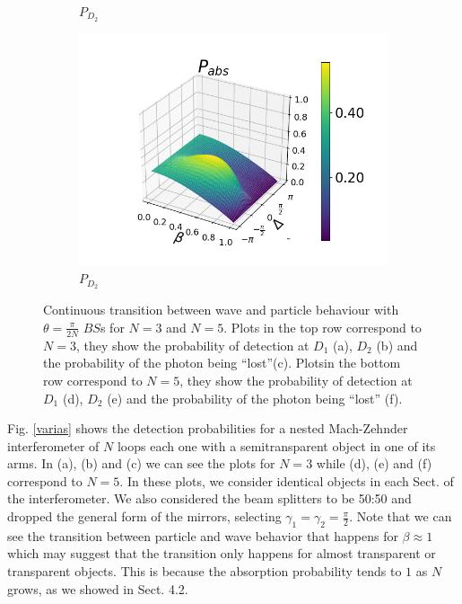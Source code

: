 \documentclass[12pt]{book}
\begin{document}
\begin{figure}[t!]
\begin{subfigure}[b]{0.3\linewidth}
\caption{$P_{D_{2}}$ }
\label{fig:BS1}
\end{subfigure}
\begin{subfigure}[b]{0.3\linewidth}
\includegraphics[width=\linewidth]{images/pabs_5.png}
\caption{$P_{D_{2}}$ }
\label{fig:BS1}
\end{subfigure}
\caption{Continuous transition between wave and particle behaviour with $\theta=\frac{\pi}{2N}$ $BS$s for $N=3$ and $N=5$. Plots in the top row correspond to $N=3$, they show the probability of detection at $D_{1}$ (a), $D_{2}$ (b) and the probability of the photon being ``lost''(c). Plotsin the bottom row correspond to $N=5$, they show the probability of detection at $D_{1}$ (d),  $D_{2}$ (e) and the probability of the photon being ``lost'' (f).}
\label{figvarias2}
\end{figure}

Fig. \ref{varias} shows the detection probabilities for a nested Mach-Zehnder interferometer of $N$ loops each one with a semitransparent object in one of its arms. In (a), (b) and (c) we can see the plots for $N=3$ while (d), (e) and (f) correspond to $N=5$. In these plots, we consider identical objects in each Sect. of the interferometer. We also considered the beam splitters to be 50:50 and dropped the general form of the mirrors, selecting $\gamma_{1}=\gamma_{2}=\frac{\pi}{2}$. Note that we can see the transition between particle and wave behavior that happens for $\beta \approx 1$ which may suggest that the transition only happens for almost transparent or transparent objects. This is because the absorption probability tends to $1$ as $N$ grows, as we showed in Sect. 4.2. 
\end{document}
